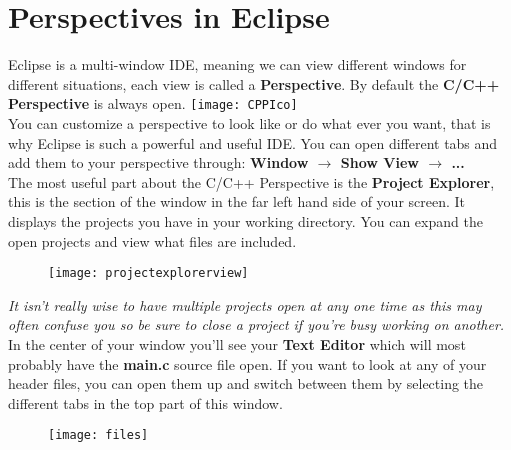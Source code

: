 {\section{Perspectives in Eclipse}
\label{sec:Perspectives}
Eclipse is a multi-window IDE, meaning we can view different windows for different situations, each view is called a \textbf{\color{Aquamarine} Perspective}. By default the \textbf{\color{Aquamarine} C/C++ Perspective} is always open. 
\texttt{[image: CPPIco]}
\\
You can customize a perspective to look like or do what ever you want, that is why Eclipse is such a powerful and useful IDE. You can open different tabs and add them to your perspective through: \textbf{\color{Green} Window $\rightarrow$ Show View $\rightarrow$ ...}
\\
The most useful part about the C/C++ Perspective is the \textbf{Project Explorer}, this is the section of the window in the far left hand side of your screen. It displays the projects you have in your working directory. You can expand the open projects and view what files are included.
\begin{figure}[htbp]
\centering
\texttt{[image: projectexplorerview]}
\end{figure}
\par
{}
\par
\emph{\color{Gray} It isn't really wise to have multiple projects open at any one time as this may often confuse you so be sure to close a project if you're busy working on another.}
\\
In the center of your window you'll see your \textbf{\color{Orange}Text Editor} which will most probably have the \textbf{\color{Aquamarine}main.c} source file open. If you want to look at any of your header files, you can open them up and switch between them by selecting the different tabs in the top part of this window.
\begin{figure}[hbtp]
\centering
\texttt{[image: files]}
\end{figure}
\par
}
